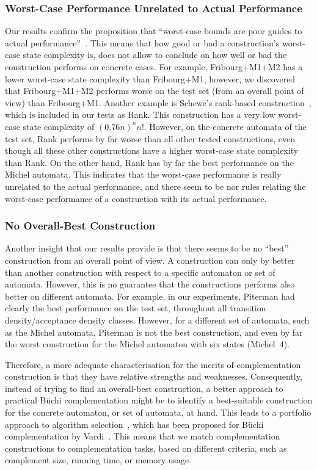 \subsubsection{Worst-Case Performance Unrelated to Actual Performance}
Our results confirm the proposition that ``worst-case bounds are poor guides to actual performance''~\cite{2011_tsai}. This means that how good or bad a construction's worst-case state complexity is, does not allow to conclude on how well or bad the construction performs on concrete cases. For example, Fribourg+M1+M2 has a lower worst-case state complexity than Fribourg+M1, however, we discovered that Fribourg+M1+M2 performs worse on the \goal{} test set (from an overall point of view) than Fribourg+M1. Another example is Schewe's rank-based construction~\cite{schewe2009buchi}, which is included in our tests as Rank. This construction has a very low worst-case state complexity of $(0.76n)^nn!$. However, on the concrete automata of the \goal{} test set, Rank performs by far worse than all other tested constructions, even though all these other constructions have a higher worst-case state complexity than Rank. On the other hand, Rank has by far the best performance on the Michel automata. This indicates that the worst-case performance is really unrelated to the actual performance, and there seem to be nor rules relating the worst-case performance of a construction with its actual performance.

\subsubsection{No Overall-Best Construction}
Another insight that our results provide is that there seems to be no ``best'' construction from an overall point of view. A construction can only by better than another construction with respect to a specific automaton or set of automata. However, this is no guarantee that the constructions performs also better on different automata. For example, in our experiments, Piterman had clearly the best performance on the \goal{} test set, throughout all transition density/acceptance density classes. However, for a different set of automata, such as the Michel automata, Piterman is not the best construction, and even by far the worst construction for the Michel automaton with six states (Michel~4).

Therefore, a more adequate characterisation for the merits of complementation construction is that they have relative strengths and weaknesses. Consequently, instead of trying to find an overall-best construction, a better approach to practical Büchi complementation might be to identify a best-suitable construction for the concrete automaton, or set of automata, at hand. This leads to a portfolio approach to algorithm selection~\cite{leyton2003portfolio}, which has been proposed for Büchi complementation by Vardi~\cite{2007_vardi_model_checking}. This means that we match complementation constructions to complementation tasks, based on different criteria, such as complement size, running time, or memory usage.

